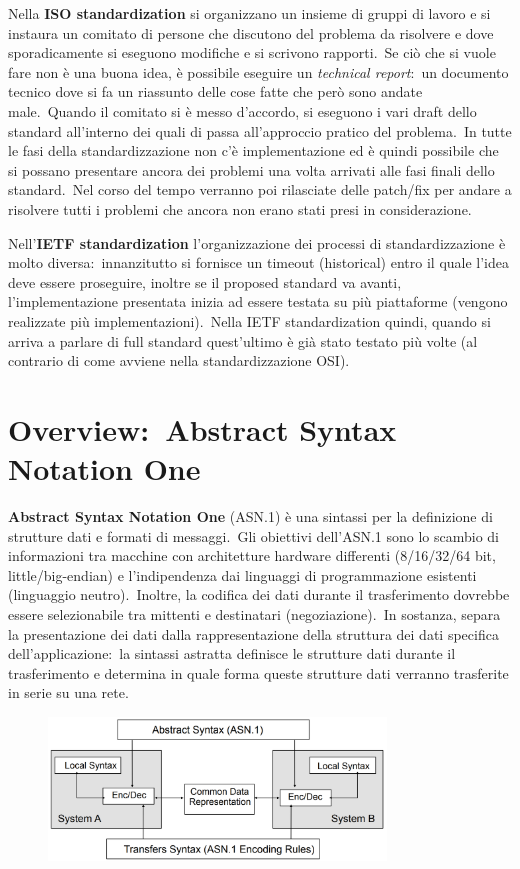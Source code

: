 \noindent Nella \textbf{ISO standardization} si organizzano un insieme di gruppi di lavoro e si instaura un comitato di persone che discutono del problema da risolvere e dove sporadicamente si eseguono modifiche e si scrivono rapporti.\
Se ciò che si vuole fare non è una buona idea, è possibile eseguire un \textit{technical report}:\ un documento tecnico dove si fa un riassunto delle cose fatte che però sono andate male.\
Quando il comitato si è messo d'accordo, si eseguono i vari draft dello standard all'interno dei quali di passa all'approccio pratico del problema.\
In tutte le fasi della standardizzazione non c'è implementazione ed è quindi possibile che si possano presentare ancora dei problemi una volta arrivati alle fasi finali dello standard.\
Nel corso del tempo verranno poi rilasciate delle patch/fix per andare a risolvere tutti i problemi che ancora non erano stati presi in considerazione.

Nell'\textbf{IETF standardization} l'organizzazione dei processi di standardizzazione è molto diversa:\ innanzitutto si fornisce un timeout (historical) entro il quale l'idea deve essere proseguire, inoltre se il proposed standard va avanti, l'implementazione presentata inizia ad essere testata su più piattaforme (vengono realizzate più implementazioni).\
Nella IETF standardization quindi, quando si arriva a parlare di full standard quest'ultimo è già stato testato più volte (al contrario di come avviene nella standardizzazione OSI).

\section{Overview:\ Abstract Syntax Notation One}

\textbf{Abstract Syntax Notation One} (ASN.1) è una sintassi per la definizione di strutture dati e formati di messaggi.\
Gli obiettivi dell'ASN.1 sono lo scambio di informazioni tra macchine con architetture hardware differenti (8/16/32/64 bit, little/big-endian) e l'indipendenza dai linguaggi di programmazione esistenti (linguaggio neutro).\
Inoltre, la codifica dei dati durante il trasferimento dovrebbe essere selezionabile tra mittenti e destinatari (negoziazione).\
In sostanza, separa la presentazione dei dati dalla rappresentazione della struttura dei dati specifica dell'applicazione:\ la sintassi astratta definisce le strutture dati durante il trasferimento e determina in quale forma queste strutture dati verranno trasferite in serie su una rete.

\begin{figure}[H]
    \centering
    \includegraphics[width=0.8\textwidth]{immagini/ASN.1.png}
\end{figure}

